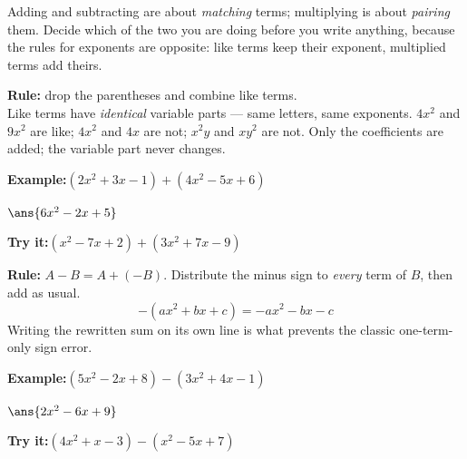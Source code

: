 \documentclass[12pt]{article}
\begin{document}

\noindent\small Adding and subtracting are about \emph{matching} terms;
multiplying is about \emph{pairing} them. Decide which of the two you are
doing before you write anything, because the rules for exponents are opposite:
like terms keep their exponent, multiplied terms add theirs.
\normalsize

\begin{formulabox}
\textbf{Rule:} drop the parentheses and combine like terms.\\[3pt]
Like terms have \emph{identical} variable parts --- same letters, same
exponents. $4x^2$ and $9x^2$ are like; $4x^2$ and $4x$ are not; $x^2y$ and
$xy^2$ are not. Only the coefficients are added; the variable part never
changes.
\end{formulabox}
\begin{examplebox}
\textbf{Example:}\quad $(2x^2 + 3x - 1) + (4x^2 - 5x + 6)$
\par
$\ans{6x^2-2x+5}$
\end{examplebox}
\begin{tryitbox}
\textbf{Try it:}\quad $(x^2 - 7x + 2) + (3x^2 + 7x - 9)$\\[2pt]
\end{tryitbox}

\begin{formulabox}
\textbf{Rule:} $A - B = A + (-B)$. Distribute the minus sign to
\emph{every} term of $B$, then add as usual.
\[ -(ax^2 + bx + c) = -ax^2 - bx - c \]
Writing the rewritten sum on its own line is what prevents the classic
one-term-only sign error.
\end{formulabox}
\begin{examplebox}
\textbf{Example:}\quad $(5x^2 - 2x + 8) - (3x^2 + 4x - 1)$
\par
$\ans{2x^2-6x+9}$
\end{examplebox}
\begin{tryitbox}
\textbf{Try it:}\quad $(4x^2 + x - 3) - (x^2 - 5x + 7)$\\[2pt]
\end{tryitbox}
\end{document}
